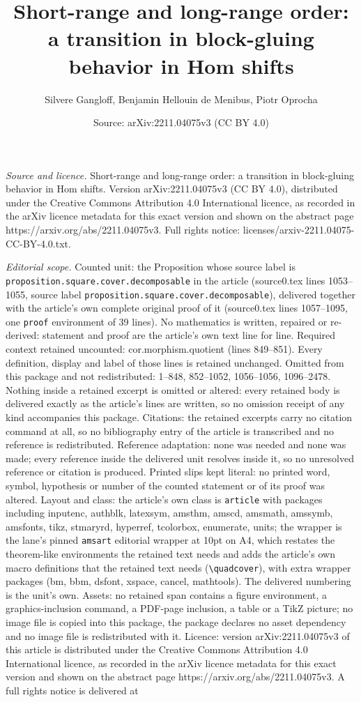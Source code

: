 \documentclass[10pt,a4paper]{amsart}
\title[Short-range and long-range order: a transition in block-glui]{Short-range and long-range order: a transition in block-gluing behavior in Hom shifts}
\author{Silvere Gangloff, Benjamin Hellouin de Menibus, Piotr Oprocha}
\date{Source: arXiv:2211.04075v3 (CC BY 4.0)}
\begin{document}
\maketitle

\noindent\emph{Source and licence.} Short-range and long-range order: a transition in block-gluing behavior in Hom shifts. Version arXiv:2211.04075v3 (CC BY 4.0), distributed under the Creative Commons Attribution 4.0 International licence, as recorded in the arXiv licence metadata for this exact version and shown on the abstract page https://arxiv.org/abs/2211.04075v3. Full rights notice: licenses/arxiv-2211.04075-CC-BY-4.0.txt.\par\smallskip

\noindent\textit{Editorial scope.} Counted unit: the Proposition whose source label is \texttt{proposition.square.cover.decomposable} in the article (source0.tex lines 1053--1055, source label \texttt{proposition.square.cover.decomposable}), delivered together with the article's own complete original proof of it (source0.tex lines 1057--1095, one \texttt{proof} environment of 39 lines). No mathematics is written, repaired or re-derived: statement and proof are the article's own text line for line. Required context retained uncounted: cor.morphism.quotient (lines 849--851). Every definition, display and label of those lines is retained unchanged. Omitted from this package and not redistributed: 1--848, 852--1052, 1056--1056, 1096--2478. Nothing inside a retained excerpt is omitted or altered: every retained body is delivered exactly as the article's lines are written, so no omission receipt of any kind accompanies this package. Citations: the retained excerpts carry no citation command at all, so no bibliography entry of the article is transcribed and no reference is redistributed. Reference adaptation: none was needed and none was made; every reference inside the delivered unit resolves inside it, so no unresolved reference or citation is produced. Printed slips kept literal: no printed word, symbol, hypothesis or number of the counted statement or of its proof was altered. Layout and class: the article's own class is \texttt{article} with packages including inputenc, authblk, latexsym, amsthm, amscd, amsmath, amssymb, amsfonts, tikz, stmaryrd, hyperref, tcolorbox, enumerate, units; the wrapper is the lane's pinned \texttt{amsart} editorial wrapper at 10pt on A4, which restates the theorem-like environments the retained text needs and adds the article's own macro definitions that the retained text needs (\texttt{\textbackslash quadcover}), with extra wrapper packages (bm, bbm, dsfont, xspace, cancel, mathtools). The delivered numbering is the unit's own. Assets: no retained span contains a figure environment, a graphics-inclusion command, a PDF-page inclusion, a table or a TikZ picture; no image file is copied into this package, the package declares no asset dependency and no image file is redistributed with it. Licence: version arXiv:2211.04075v3 of this article is distributed under the Creative Commons Attribution 4.0 International licence, as recorded in the arXiv licence metadata for this exact version and shown on the abstract page https://arxiv.org/abs/2211.04075v3. A full rights notice is delivered at 
\end{document}
